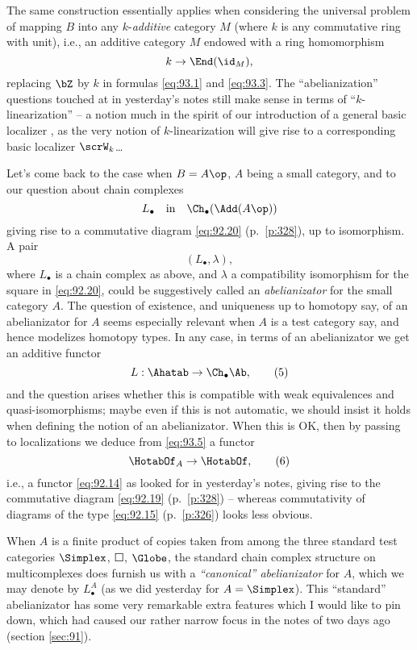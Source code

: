 \begin{remark}
  The same construction essentially applies when considering the
  universal problem of mapping $B$ into any $k$-\emph{additive}
  category $M$ (where $k$ is any commutative ring with unit), i.e.,
  an additive category $M$ endowed with a ring homomorphism
  \[k\to\End(\id_M),\]
  replacing $\bZ$ by $k$ in formulas \eqref{eq:93.1} and
  \eqref{eq:93.3}. The ``abelianization'' questions touched at in
  yesterday's notes still make sense in terms of ``$k$-linearization''
  -- a notion much in the spirit of our introduction of a general
  basic localizer \scrW, as the very notion of $k$-linearization will
  give rise to a corresponding basic localizer $\scrW_k$\ldots
\end{remark}

Let's come back to the case when $B=A\op$, $A$ being a small category,
and to our question about chain complexes
\[L_\bullet \quad\text{in}\quad \Ch_\bullet(\Add(A\op))\]
giving rise to a commutative diagram \eqref{eq:92.20} (p.\
\ref{p:328}), up to isomorphism. A pair
\[(L_\bullet,\lambda),\]
where $L_\bullet$ is a chain complex as above, and $\lambda$ a
compatibility isomorphism for the square in \eqref{eq:92.20}, could be
suggestively called an \emph{abelianizator} for the small category
$A$. The question of existence, and uniqueness up to homotopy say, of
an abelianizator for $A$ seems especially relevant when $A$ is a test
category say, and hence \Ahat{} modelizes homotopy types. In any case,
in terms of an abelianizator we get an additive functor
\begin{equation}
  \label{eq:93.5}
  L:\Ahatab\to\Ch_\bullet\Ab,\tag{5}
\end{equation}
and the question arises whether this is compatible with weak
equivalences and quasi-isomorphisms; maybe even if this is not
automatic, we should insist it holds when defining the notion of an
abelianizator. When this is OK, then by passing to localizations we
deduce from \eqref{eq:93.5} a functor
\begin{equation}
  \label{eq:93.6}
  \HotabOf_A\to\HotabOf,\tag{6}
\end{equation}
i.e., a functor \eqref{eq:92.14} as looked for in yesterday's notes,
giving rise to the commutative diagram \eqref{eq:92.19} (p.\
\ref{p:328}) -- whereas commutativity of diagrams of the type
\eqref{eq:92.15} (p.\ \ref{p:326}) looks less obvious.

When $A$ is a finite product of copies taken from among
the three standard test categories $\Simplex$, $\Square$, $\Globe$,
the standard chain complex structure on multicomplexes does furnish us
with a \emph{``canonical'' abelianizator} for $A$, which we may denote
by $L_\bullet^A$ (as we did yesterday for $A=\Simplex$). This
``standard'' abelianizator has some very remarkable extra features
which I would like to pin down, which had caused our rather narrow
focus in the notes of two days ago (section \ref{sec:91}).

